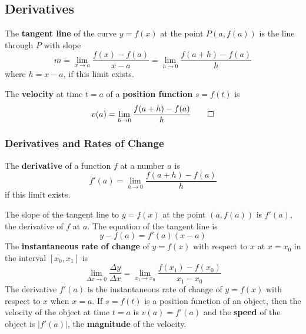 \subsection{Derivatives}
\begin{definition}
    The \textbf{tangent line} of the curve \(y=f(x)\) at the point \(P(a, f(a))\)
    is the line through \(P\) with slope
    \[m=\lim_{x\to a}\frac{f(x)-f(a)}{x-a}=\lim_{h\to 0}\frac{f(a+h)-f(a)}{h}\]
    where \(h=x-a\), if this limit exists.
\end{definition}
\begin{definition}
    The \textbf{velocity} at time \(t=a\) of a \textbf{position function}
    \(s=f(t)\) is \[v(a)=\lim_{h\to 0}\frac{f(a+h)-f(a)}{h}\qedhere\]
\end{definition}

\subsubsection{Derivatives and Rates of Change}
\begin{definition}
    The \textbf{derivative} of a function \(f\) at a number \(a\) is
    \[f'(a)=\lim_{h\to 0}\frac{f(a+h)-f(a)}{h}\] if this limit exists.
\end{definition}
The slope of the tangent line to \(y=f(x)\) at the point \((a,f(a))\) is
\(f'(a)\), the derivative of \(f\) at \(a\).
The equation of the tangent line is \[y-f(a)=f'(a)(x-a)\]
The \textbf{instantaneous rate of change} of \(y=f(x)\) with respect to \(x\)
at \(x=x_0\) in the interval \([x_0,x_1]\) is
\[\lim_{\Delta x\to 0}\frac{\Delta y}{\Delta x}
=\lim_{x_1 \to x_0}\frac{f(x_1)-f(x_0)}{x_1-x_0}\]
The derivative \(f'(a)\) is the instantaneous rate of change of \(y=f(x)\)
with respect to \(x\) when \(x=a\).
If \(s=f(t)\) is a position function of an object, then the velocity of the
object at time \(t=a\) is \(v(a)=f'(a)\) and the \textbf{speed} of the
object is \(|f'(a)|\), the \textbf{magnitude} of the velocity.

